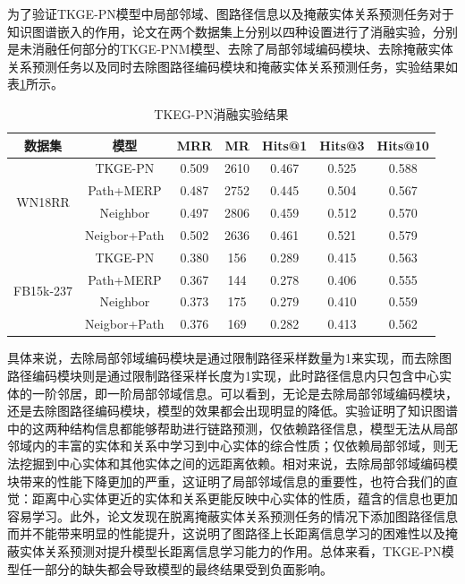 为了验证TKGE-PN模型中局部邻域、图路径信息以及掩蔽实体关系预测任务对于知识图谱嵌入的作用，论文在两个数据集上分别以四种设置进行了消融实验，分别是未消融任何部分的TKGE-PNM模型、去除了局部邻域编码模块、去除掩蔽实体关系预测任务以及同时去除图路径编码模块和掩蔽实体关系预测任务，实验结果如表\ref{ablation_tab}所示。

\begin{table}[htbp]
    \begin{center}
        \caption{TKEG-PN消融实验结果}
        \setlength{\tabcolsep}{10pt}
        \renewcommand{\arraystretch}{1.5}
        \begin{tabular}{*{7}{c}}
            \toprule
            数据集 & 模型 & MRR&MR&Hits@1&Hits@3&	Hits@10\\
            \midrule
            \multirow{4}{*}{WN18RR}&TKGE-PN&0.509&2610&0.467&0.525&0.588\\
            &Path+MERP&0.487&2752&0.445&0.504&0.567\\
            &Neighbor&0.497&2806&0.459&0.512&0.570\\
            &Neigbor+Path&0.502&2636&0.461&0.521&0.579\\
            \cmidrule{1-7}
            \multirow{4}{*}{FB15k-237}&TKGE-PN&0.380&156&0.289&0.415&0.563\\
            &Path+MERP&0.367&144&0.278&0.406&0.555\\
            &Neighbor&0.373&175&0.279&0.410&0.559\\
            &Neigbor+Path&0.376&169&0.282&0.413&0.562\\
            \bottomrule
        \end{tabular}
        \label{ablation_tab}
    \end{center}
\end{table}

具体来说，去除局部邻域编码模块是通过限制路径采样数量为1来实现，而去除图路径编码模块则是通过限制路径采样长度为1实现，此时路径信息内只包含中心实体的一阶邻居，即一阶局部邻域信息。可以看到，无论是去除局部邻域编码模块，还是去除图路径编码模块，模型的效果都会出现明显的降低。实验证明了知识图谱中的这两种结构信息都能够帮助进行链路预测，仅依赖路径信息，模型无法从局部邻域内的丰富的实体和关系中学习到中心实体的综合性质；仅依赖局部邻域，则无法挖掘到中心实体和其他实体之间的远距离依赖。相对来说，去除局部邻域编码模块带来的性能下降更加的严重，这证明了局部邻域信息的重要性，也符合我们的直觉：距离中心实体更近的实体和关系更能反映中心实体的性质，蕴含的信息也更加容易学习。此外，论文发现在脱离掩蔽实体关系预测任务的情况下添加图路径信息而并不能带来明显的性能提升，这说明了图路径上长距离信息学习的困难性以及掩蔽实体关系预测对提升模型长距离信息学习能力的作用。总体来看，TKGE-PN模型任一部分的缺失都会导致模型的最终结果受到负面影响。

